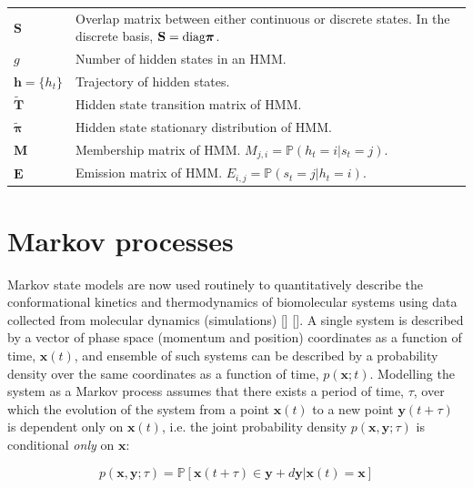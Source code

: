 \begin{table}
\begin{tabularx}{0.9\textwidth}{ |l| >{\raggedright\arraybackslash}X | }
        $\mathbf{S}$ & Overlap matrix between  either continuous or discrete states. In the discrete basis, $\mathbf{S} = \textnormal{diag} \bm{\pi}$. \\
        $g$ & Number of hidden states in an HMM. \\
        $\mathbf{h} = \{h_t\}$ & Trajectory of hidden states. \\
        $\widetilde{\mathbf{T}}$ & Hidden state transition matrix of HMM. \\
        $\widetilde{\bm{\pi}}$ & Hidden state stationary distribution of HMM. \\
        $\mathbf{M}$ & Membership matrix of HMM. $M_{j,i} = \mathbb{P}(h_t=i|s_t=j)$. \\
        $\mathbf{E}$ & Emission matrix of HMM. $E_{i, j}= \mathbb{P}(s_t=j|h_t=i)$. \\
     \hline
     \end{tabularx}
    \label{tab:theory_symbols}
\end{table}




\section{Markov processes}

Markov state models are now used routinely to quantitatively describe the conformational kinetics and thermodynamics of biomolecular systems using data collected from molecular dynamics (simulations) [] []. A single system is described by a vector of phase space (momentum and position) coordinates as a function of time, $\mathbf{x}(t)$, and ensemble of such systems can be described by a probability density over the same coordinates as a function of time, $p(\mathbf{x}; t)$. Modelling the system as a Markov process assumes that there exists a period of time, $\tau$, over which the evolution of the system from a point $\mathbf{x}(t)$ to a new point $\mathbf{y}(t+\tau)$ is dependent only on $\mathbf{x}(t)$, i.e. the joint probability density $p(\mathbf{x}, \mathbf{y} ; \tau)$ is conditional \emph{only} on $\mathbf{x}$:

\begin{equation}\label{eqn:markov_assumption}
p(\mathbf{x}, \mathbf{y} ; \tau)=\mathbb{P}[\mathbf{x}(t+\tau) \in \mathbf{y}+d \mathbf{y} | \mathbf{x}(t)=\mathbf{x}]
\end{equation}

